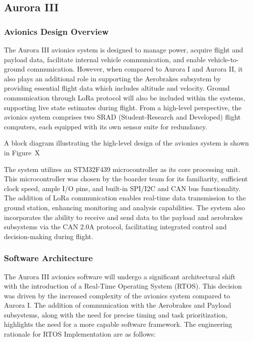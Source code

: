 \subsection{Aurora III}
\subsubsection{Avionics Design Overview}
The Aurora III avionics system is designed to manage power, acquire flight and payload data, facilitate internal vehicle communication, and enable vehicle-to-ground communication. However, when compared to Aurora I and Aurora II, it also plays an additional role in supporting the Aerobrakes subsystem by providing essential flight data which includes altitude and velocity. Ground communication through LoRa protocol will also be included within the systems, supporting live state estimates during flight. From a high-level perspective, the avionics system comprises two SRAD (Student-Research and Developed) flight computers, each equipped with its own sensor suite for redundancy. 

A block diagram illustrating the high-level design of the avionics system is shown in Figure~X

The system utilizes an STM32F439 microcontroller as its core processing unit. This microcontroller was chosen by the boarder team for its familiarity, sufficient clock speed, ample I/O pins, and built-in SPI/I2C and CAN bus functionality. The addition of LoRa communication enables real-time data transmission to the ground station, enhancing monitoring and analysis capabilities. The system also incorporates the ability to receive and send data to the payload and aerobrakes subsystems via the CAN 2.0A protocol, facilitating integrated control and decision-making during flight. 

\subsubsection{Software Architecture}
The Aurora III avionics software will undergo a significant architectural shift with the introduction of a Real-Time Operating System (RTOS). This decision was driven by the increased complexity of the avionics system compared to Aurora I. The addition of communication with the Aerobrakes and Payload subsystems, along with the need for precise timing and task prioritization, highlights the need for a more capable software framework. The engineering rationale for RTOS Implementation are as follows:  

